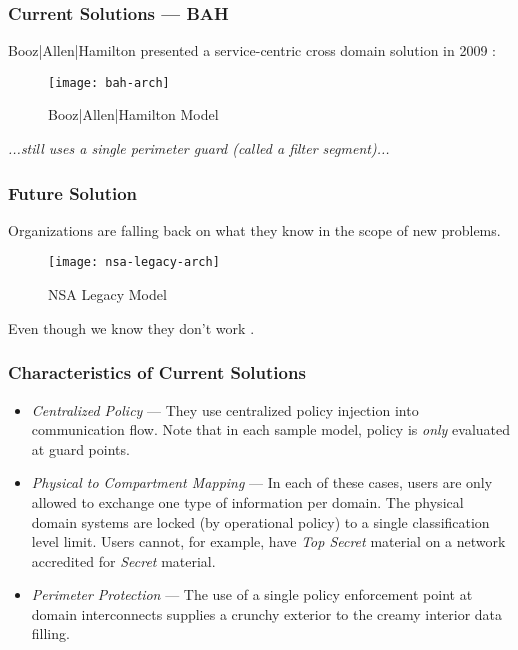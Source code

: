 \begin{frame}[t]
\frametitle{Current Solutions --- BAH}
{Booz|Allen|Hamilton} presented a service-centric cross domain solution in 2009 \cite{proposal:bah-arch}:
\begin{figure}[!t]
\centering
\texttt{[image: bah-arch]}
\caption{Booz|Allen|Hamilton Model}
\label{fig:model:conceptual-model}
\end{figure}
\textit{...still uses a single perimeter guard (called a filter segment)...}
\end{frame}

\begin{frame}[t]
\frametitle{Future Solution}
Organizations are falling back on what they know in the scope of new problems.
\begin{figure}[!t]
\centering
\texttt{[image: nsa-legacy-arch]}
\caption{NSA Legacy Model}
\label{fig:model:conceptual-model}
\end{figure}
Even though we know they don't work \cite{proposal:ron-ross}.
\end{frame}

%
\begin{frame}
\frametitle{Characteristics of Current Solutions}
\begin{itemize}
\item<2-> \textit{Centralized Policy} --- They use centralized policy injection into communication flow.  Note that in each sample model, policy is \textit{only} evaluated at guard points.
\item<3-> \textit{Physical to Compartment Mapping} --- In each of these cases, users are only allowed to exchange one type of information per domain.  The physical domain systems are locked (by operational policy) to a single classification level limit.  Users cannot, for example, have \emph{Top Secret} material on a network accredited for \emph{Secret} material.
\item<4-> \textit{Perimeter Protection} --- The use of a single policy enforcement point at domain interconnects supplies a crunchy exterior to the creamy interior data filling.
\end{itemize}
\end{frame}

